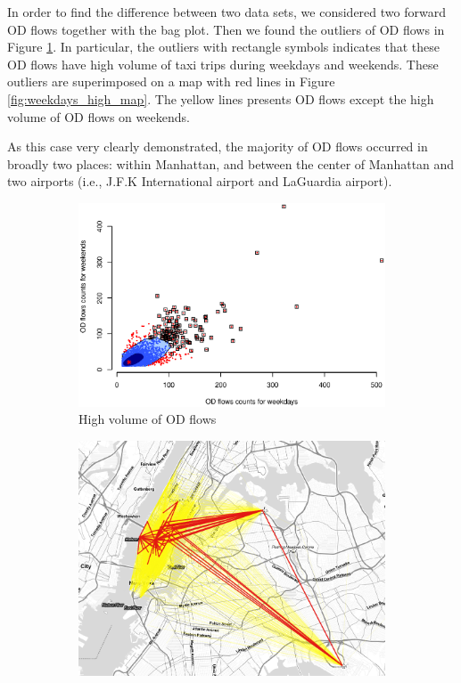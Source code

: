 \documentclass[a4paper,UKenglish]{lipics-v2016}
\begin{document}
In order to find the difference between two data sets, we considered two forward OD flows together with the bag plot. Then we found the outliers of OD flows in Figure \ref{fig:weekdays_high}. In particular, the outliers with rectangle symbols indicates that these OD flows have high volume of taxi trips during weekdays and weekends. These outliers are superimposed on a map with red lines in Figure \ref{fig:weekdays_high_map}. The yellow lines presents OD flows except the high volume of OD flows on weekends. 

As this case very clearly demonstrated, the majority of OD flows occurred in broadly two places: within Manhattan, and between the center of Manhattan and two airports (i.e., J.F.K International airport and LaGuardia airport).  


\begin{figure}
	\centering
	\begin{subfigure}[b]{0.49\textwidth}
		\includegraphics[width=\textwidth]{images/Outliers_high_weekdays_weekends.eps}
		\caption{High volume of OD flows}
		\label{fig:weekdays_high}
	\end{subfigure}
	\hfill %
	\begin{subfigure}[b]{0.49\textwidth}
		\includegraphics[width=\textwidth]{images/outliers2_high_weekdays_weekends.png}

\end{subfigure}
\end{figure}
\end{document}
